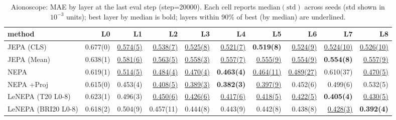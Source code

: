 \begin{table}[t]
\centering
\scriptsize
\caption{Aionoscope: MAE by layer at the last eval step (step=20000). Each cell reports $\mathrm{median}(\mathrm{std})$ across seeds (std shown in $10^{-3}$ units); best layer by median is bold; layers within 90\% of best (by median) are underlined.}
\label{tab:aiono_last_step_by_layer_mae}
\begin{tabular}{lrrrrrrrrr}
\toprule
method & L0 & L1 & L2 & L3 & L4 & L5 & L6 & L7 & L8 \\
\midrule
JEPA (CLS) & 0.677(0) & \underline{0.574(5)} & \underline{0.538(7)} & \underline{0.525(8)} & \underline{0.521(7)} & \textbf{0.519(8)} & \underline{0.524(9)} & \underline{0.524(10)} & \underline{0.526(10)} \\
JEPA (Mean) & 0.638(1) & \underline{0.581(6)} & \underline{0.563(5)} & \underline{0.558(3)} & \underline{0.557(7)} & \underline{0.555(9)} & \underline{0.554(9)} & \textbf{0.554(8)} & \underline{0.557(9)} \\
NEPA & 0.619(1) & \underline{0.514(5)} & \underline{0.484(4)} & \underline{0.470(4)} & \textbf{0.463(4)} & \underline{0.464(11)} & \underline{0.489(27)} & 0.610(37) & \underline{0.470(5)} \\
NEPA +Proj & 0.615(0) & 0.453(4) & \underline{0.408(5)} & \underline{0.389(3)} & \textbf{0.382(3)} & \underline{0.397(9)} & 0.452(6) & 0.499(6) & 0.532(5) \\
LeNEPA (T20 L0-8) & 0.623(1) & 0.496(3) & \underline{0.450(6)} & \underline{0.426(6)} & \underline{0.417(6)} & \underline{0.418(5)} & \underline{0.422(5)} & \textbf{0.405(4)} & \underline{0.430(5)} \\
LeNEPA (BRI20 L0-8) & 0.618(2) & 0.504(9) & 0.457(11) & 0.444(8) & 0.443(9) & 0.442(8) & 0.438(8) & \underline{0.428(3)} & \textbf{0.392(4)} \\
\bottomrule
\end{tabular}
\end{table}
